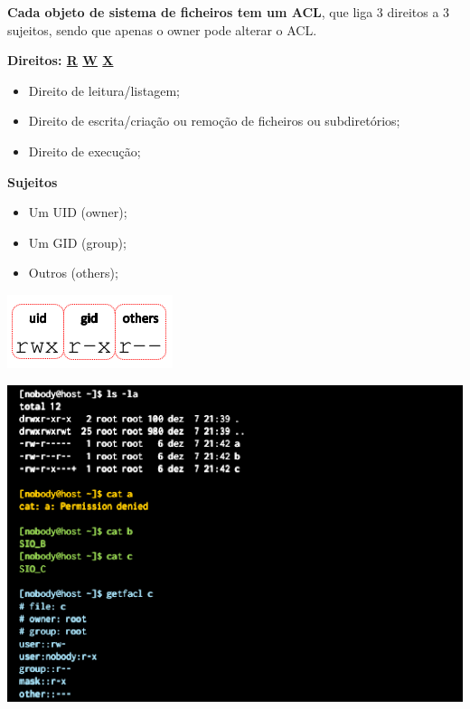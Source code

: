 \documentclass{article}
\begin{document}
\begin{flushleft}
  \textbf{Cada objeto de sistema de ficheiros tem um ACL},
  que liga 3 direitos a 3 sujeitos, sendo que apenas o owner pode
  alterar o ACL.

  \vspace{2mm}

  \textbf{Direitos: \uline{R} \uline{W} \uline{X}}
  \begin{itemize}
    \item Direito de leitura/listagem;
    \item Direito de escrita/criação ou remoção de ficheiros ou subdiretórios;
    \item Direito de execução;
  \end{itemize}

  \vspace{2mm}

  \textbf{Sujeitos}
  \begin{itemize}
    \item Um UID (owner);
    \item Um GID (group);
    \item Outros (others);
  \end{itemize}

  \begin{center}
    \includegraphics[scale=0.4]{35}
  \end{center}
\end{flushleft}

\pagebreak

\begin{center}
  \includegraphics[scale=0.4]{36}
\end{center}
\end{document}
